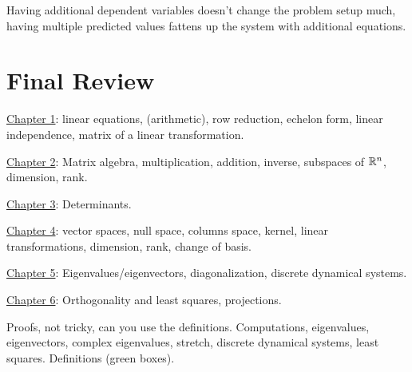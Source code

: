 \documentclass[10pt,a4paper]{article}
\begin{document}
Having additional dependent variables doesn't change the problem setup much, having multiple predicted values fattens up the system with additional equations.

\section{Final Review}

\underline{Chapter 1}: linear equations, (arithmetic), row reduction, echelon form, linear independence, matrix of a linear transformation.

\underline{Chapter 2}: Matrix algebra, multiplication, addition, inverse, subspaces of $\mathbb{R}^n$, dimension, rank.

\underline{Chapter 3}: Determinants.

\underline{Chapter 4}: vector spaces, null space, columns space, kernel, linear transformations, dimension, rank, change of basis.

\underline{Chapter 5}: Eigenvalues/eigenvectors, diagonalization, discrete dynamical systems.

\underline{Chapter 6}: Orthogonality and least squares, projections.

Proofs, not tricky, can you use the definitions. Computations, eigenvalues, eigenvectors, complex eigenvalues, stretch, discrete dynamical systems, least squares. Definitions (green boxes).
\end{document}
